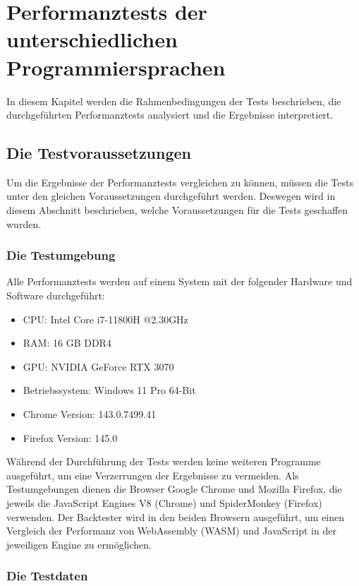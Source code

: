 \chapter{Performanztests der unterschiedlichen Programmiersprachen}
\label{cha:PerformanztestsderunterschiedlichenProgrammiersprachen}

In diesem Kapitel werden die Rahmenbedingungen der Tests beschrieben, die durchgeführten Performanztests analysiert und die Ergebnisse interpretiert.

\section{Die Testvoraussetzungen}
\label{sec:DieTestvoraussetzungen}

Um die Ergebnisse der Performanztests vergleichen zu können, müssen die Tests unter den gleichen Voraussetzungen durchgeführt werden.
Deswegen wird in diesem Abschnitt beschrieben, welche Voraussetzungen für die Tests geschaffen wurden.

\subsection{Die Testumgebung}
\label{subsec:DieTestumgebung}

Alle Performanztests werden auf einem System mit der folgender Hardware und Software durchgeführt:
\begin{itemize}
    \item CPU: Intel Core i7-11800H @2.30GHz
    \item RAM: 16 GB DDR4
    \item GPU: NVIDIA GeForce RTX 3070
    \item Betriebssystem: Windows 11 Pro 64-Bit
    \item Chrome Version: 143.0.7499.41
    \item Firefox Version: 145.0
\end{itemize}
Während der Durchführung der Tests werden keine weiteren Programme ausgeführt, um eine Verzerrungen der Ergebnisse zu vermeiden.
Als Testumgebungen dienen die Browser Google Chrome und Mozilla Firefox, die jeweils die JavaScript Engines V8 (Chrome) \cite{V8_2025} und SpiderMonkey (Firefox) \cite{SpiderMonkey2025} verwenden.
Der Backtester wird in den beiden Browsern ausgeführt, um einen Vergleich der Performanz von WebAssembly (WASM) und JavaScript in der jeweiligen Engine zu ermöglichen.

\subsection{Die Testdaten}
\label{subsec:DieTestdaten}

